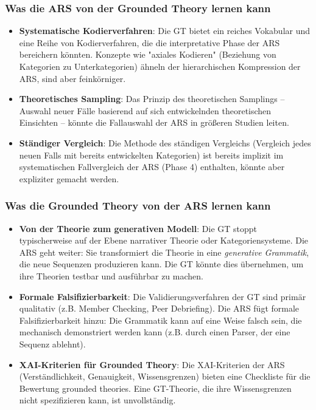 \documentclass[12pt,a4paper]{article}
\begin{document}
\subsubsection{Was die ARS von der Grounded Theory lernen kann}

\begin{itemize}
    \item \textbf{Systematische Kodierverfahren}: Die GT bietet ein reiches 
    Vokabular und eine Reihe von Kodierverfahren, die die interpretative 
    Phase der ARS bereichern könnten. Konzepte wie "axiales Kodieren" 
    (Beziehung von Kategorien zu Unterkategorien) ähneln der hierarchischen 
    Kompression der ARS, sind aber feinkörniger.
    
    \item \textbf{Theoretisches Sampling}: Das Prinzip des theoretischen 
    Samplings – Auswahl neuer Fälle basierend auf sich entwickelnden 
    theoretischen Einsichten – könnte die Fallauswahl der ARS in größeren 
    Studien leiten.
    
    \item \textbf{Ständiger Vergleich}: Die Methode des ständigen Vergleichs 
    (Vergleich jedes neuen Falls mit bereits entwickelten Kategorien) ist 
    bereits implizit im systematischen Fallvergleich der ARS (Phase 4) 
    enthalten, könnte aber expliziter gemacht werden.
\end{itemize}

\subsubsection{Was die Grounded Theory von der ARS lernen kann}

\begin{itemize}
    \item \textbf{Von der Theorie zum generativen Modell}: Die GT stoppt 
    typischerweise auf der Ebene narrativer Theorie oder Kategoriensysteme. 
    Die ARS geht weiter: Sie transformiert die Theorie in eine \textit{generative 
    Grammatik}, die neue Sequenzen produzieren kann. Die GT könnte dies 
    übernehmen, um ihre Theorien testbar und ausführbar zu machen.
    
    \item \textbf{Formale Falsifizierbarkeit}: Die Validierungsverfahren der 
    GT sind primär qualitativ (z.B. Member Checking, Peer Debriefing). Die 
    ARS fügt formale Falsifizierbarkeit hinzu: Die Grammatik kann auf eine 
    Weise falsch sein, die mechanisch demonstriert werden kann (z.B. durch 
    einen Parser, der eine Sequenz ablehnt).
    
    \item \textbf{XAI-Kriterien für Grounded Theory}: Die XAI-Kriterien der 
    ARS (Verständlichkeit, Genauigkeit, Wissensgrenzen) bieten eine Checkliste 
    für die Bewertung grounded theories. Eine GT-Theorie, die ihre 
    Wissensgrenzen nicht spezifizieren kann, ist unvollständig.
\end{itemize}
\end{document}
